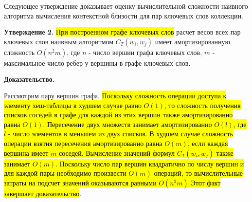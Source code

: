 Следующее утверждение доказывает оценку вычислительной сложности наивного алгоритма вычисления контекстной близости для пар ключевых слов коллекции.

\textbf{Утверждение 2.} \hl{При построенном графе ключевых слов} расчет весов всех пар ключевых слов наивным алгоритмом $C_T(w_i, w_j)$ имеет амортизированную сложность $O(n^2m)$, где $n$ - число вершин графа ключевых слов, $m$ - максимальное число ребер у вершины в графе ключевых слов.

\textbf{Доказательство.} 

Рассмотрим пару вершин графа. \hl{Поскольку сложность операции доступа к элементу хеш-таблицы в худшем случае равно $O(1)$, то сложность получения списков соседей в графе для каждой из этих вершин также амортизированно равна $O(1)$. Пересечение двух множеств занимает амортизированно $O(l)$, где $l$ - число элементов в меньшем из двух списков. В худшем случае сложность операции взятия пересечения амортизированно равна $O(m)$, если каждая вершина имеет $m$ соседей. Вычисление значений формул $C_T(w_i, w_j)$ также занимает $O(m)$. Поскольку число пар вершин квадратично по числу вершин и для каждой пары необходимо произвести $O(m)$ операций, то вычислительные затраты на подсчет значений оказываются равными $O(n^2m)$ Этот факт завершает доказательство}.




